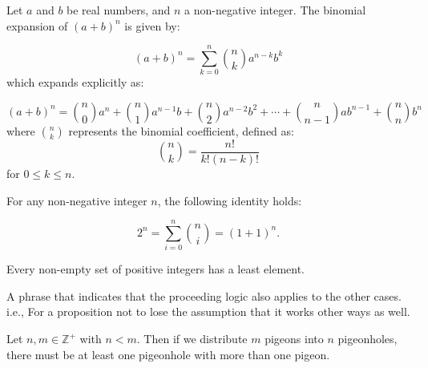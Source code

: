 \begin{theo}

    \label{thm:binomial}
    
    Let \(a\) and \(b\) be real numbers, and \(n\) a non-negative integer. The binomial expansion of \((a + b)^n\) is given by:
    
    \[
    (a + b)^n = \sum_{k=0}^{n} \binom{n}{k} a^{n-k} b^k
    \]
    which expands explicitly as:
    
    \[
    (a + b)^n = \binom{n}{0} a^n + \binom{n}{1} a^{n-1}b + \binom{n}{2} a^{n-2}b^2 + \cdots + \binom{n}{n-1} a b^{n-1} + \binom{n}{n} b^n
    \]
    \noindent
    where \(\binom{n}{k}\) represents the binomial coefficient, defined as:
    \Large
    \[
    \binom{n}{k} = \frac{n!}{k!(n-k)!}
    \]
    \normalsize
    for \(0 \leq k \leq n\).

\end{theo}

\newpage

\begin{theo}

    \label{thm:binomial_2n}

    For any non-negative integer \(n\), the following identity holds:
    
    \[
    2^n = \sum_{i=0}^{n} \binom{n}{i} = (1 + 1)^n.
    \]

\end{theo}

\begin{Def}

    \label{def:well_ordering_principle}

    Every non-empty set of positive integers has a least element.
\end{Def}

\begin{Def}

    \label{def:wlog}

    A phrase that indicates that the proceeding logic also applies to the other cases.
    i.e., For a proposition not to lose the assumption that it works other ways as well.

\end{Def}
\begin{theo}

    Let \( n, m \in \mathbb{Z}^+ \) with \( n < m \). Then if we distribute \( m \) pigeons into \( n \) pigeonholes, there must be at least one pigeonhole with more than one pigeon.
\end{theo}

